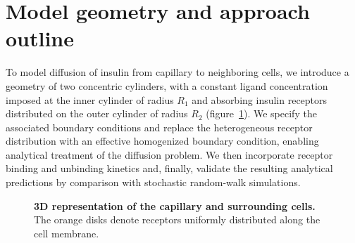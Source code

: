 \section{Model geometry and approach outline}\label{sec:geometry}
To model diffusion of insulin from capillary to neighboring cells,
we introduce a geometry of two concentric cylinders,
with a constant ligand concentration imposed at the inner cylinder of radius $R_1$ and absorbing insulin receptors distributed on the outer cylinder of radius $R_2$ (figure~\ref{fig:capillary_cells}).
We specify the associated boundary conditions and replace the heterogeneous receptor distribution with an effective homogenized boundary condition,
enabling analytical treatment of the diffusion problem.
We then incorporate receptor binding and unbinding kinetics and, finally, validate the resulting analytical predictions by comparison with stochastic random-walk simulations.

\begin{figure}[H]
    \centering
    \caption{\textbf{3D representation of the capillary and surrounding cells.} The orange disks denote receptors uniformly distributed along the cell membrane.}
    \label{fig:capillary_cells}
\end{figure}

